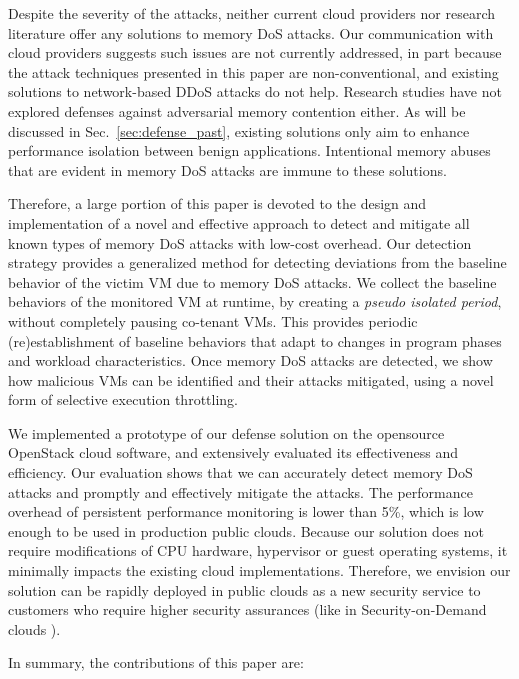 \documentclass{sig-alternate}
\newcommand{\attackname}{memory DoS attacks\xspace}
\newcommand{\secref}[1]{\mbox{Sec.~\ref{#1}}\xspace}
\begin{document}
Despite the severity of the attacks, neither current cloud providers nor research 
literature offer any solutions to \attackname. Our communication with cloud 
providers suggests such issues are not currently addressed, in part because the 
attack techniques presented in this paper are non-conventional, and existing 
solutions to network-based DDoS attacks do not help. Research studies have not 
explored defenses against adversarial memory contention either. As will be 
discussed in \secref{sec:defense_past}, existing solutions \cite{DeKo:13, ZhLaMa:14, 
YaBrMa:13, ZhBlFe:10, AhKiHa:12} only aim 
to enhance performance isolation between benign applications. Intentional memory 
abuses that are evident in \attackname are immune to these solutions.


Therefore, a large portion of this paper is devoted to the design and implementation of a novel and effective approach to detect and mitigate all known types of \attackname with low-cost overhead. Our detection strategy provides a generalized method for detecting deviations from the baseline behavior of the victim VM due to \attackname. We collect the baseline behaviors of the monitored VM at runtime, by creating a \emph{pseudo isolated period}, without completely pausing co-tenant VMs. This provides periodic (re)establishment of baseline behaviors that adapt to changes in program phases and workload characteristics. Once \attackname are detected, we show how malicious VMs can be identified and their attacks mitigated, using a novel form of selective execution throttling.

We implemented a prototype of our defense solution on the opensource OpenStack cloud 
software, and extensively evaluated its effectiveness and efficiency.  Our
evaluation shows that we can accurately detect
\attackname and promptly and effectively mitigate the attacks. The performance
overhead of persistent performance monitoring is lower than 5\%, which is low
enough to be used in production public clouds.  Because our solution does not 
require modifications of CPU hardware, hypervisor or guest operating systems, it
minimally impacts the existing cloud implementations. Therefore, we envision our
solution can be rapidly deployed in public clouds as a new security service to
customers who require higher security assurances (like in Security-on-Demand clouds \cite{JaSzPe:13, ZhLe:15}).


In summary, the contributions of this paper are: 
\end{document}

